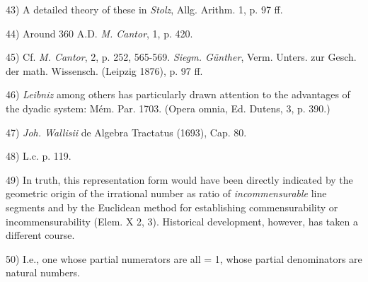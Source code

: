 \vfill
\leftline{\rule{2in}{0.4pt}}
\vspace{0.2cm}
{
\footnotesize
43) A detailed theory of these in \textit{Stolz}, Allg. Arithm. 1, p. 97 ff.

44) Around 360 A.D. \textit{M. Cantor}, 1, p. 420.

45) Cf. \textit{M. Cantor}, 2, p. 252, 565-569. \textit{Siegm. Günther}, Verm. Unters. zur Gesch. der math. Wissensch. (Leipzig 1876), p. 97 ff.

46) \textit{Leibniz} among others has particularly drawn attention to the advantages of the dyadic system: Mém. Par. 1703. (Opera omnia, Ed. Dutens, 3, p. 390.)

47) \textit{Joh. Wallisii} de Algebra Tractatus (1693), Cap. 80.

48) L.c. p. 119.

49) In truth, this representation form would have been directly indicated by the geometric origin of the irrational number as ratio of \textit{incommensurable} line segments and by the Euclidean method for establishing commensurability or incommensurability (Elem. X 2, 3). Historical development, however, has taken a different course.

50) I.e., one whose partial numerators are all = 1, whose partial denominators are natural numbers.

}

